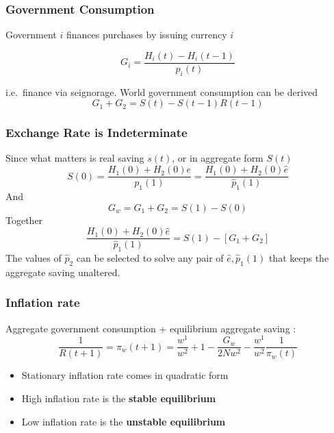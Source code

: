 \begin{frame}
    \frametitle{Government Consumption}

    Government $i$ finances purchases by issuing currency $i$

    \begin{equation*}
        G_i = \frac{H_i(t) - H_i(t-1)}{p_i(t)}
    \end{equation*}

    i.e.~finance via seignorage. 
    \vfill 
    World government consumption can be derived
    \begin{equation*}
        G_1 + G_2 = S(t) - S(t-1)R(t-1)
    \end{equation*}
    
\end{frame}

\begin{frame}
    \frametitle{Exchange Rate is Indeterminate}
    Since what matters is real saving $s(t)$, or in aggregate form $S(t)$
    \begin{equation*}
        S(0) = \frac{H_1(0) + H_2(0)e}{p_1(1)} = \frac{H_1(0) + H_2(0)\hat{e}}{\hat{p}_1(1)}
    \end{equation*}
    And 
    \begin{equation*}
        G_w = G_1 + G_2 = S(1)  - S(0)
    \end{equation*}
    Together 
    \begin{equation*}
        \frac{H_1(0) + H_2(0)\hat{e}}{\hat{p}_1(1)} = S(1) - [G_1 + G_2]
    \end{equation*}
    The values of $\hat{p}_2$ can be selected to solve any pair of $\hat{e}, \hat{p}_1(1)$ 
    that keeps the aggregate saving unaltered. 

\end{frame}

\begin{frame}
    \frametitle{Inflation rate}
    Aggregate government consumption + equilibrium aggregate saving : 
    \begin{equation*}
        \frac{1}{R(t+1)} = \pi_w(t+1) = \frac{w^1}{w^2} + 1 - \frac{G_w}{2Nw^2} - \frac{w^1}{w^2} \frac{1}{\pi_w(t)}
    \end{equation*}
    \begin{itemize}
        \item Stationary inflation rate comes in quadratic form
        \item High inflation rate is the \textbf{stable equilibrium}
        \item Low inflation rate is the \textbf{unstable equilibrium}
    \end{itemize}

\end{frame}

